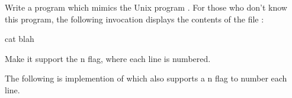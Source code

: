 \begin{Exercise}[title={Cat},difficulty=1]
\label{ex:cat}
\Question \label{ex:cat q1} Write a program which mimics the Unix program
. For those who don't know this program, the following 
invocation displays the contents of the file :
\begin{display}
\pr cat blah
\end{display}

\Question Make it support the \-n flag, where each line is
numbered.

\end{Exercise}

\begin{Answer}
\Question The following is implemention of  which also 
supports a \-n flag to number each line.

\showremarks
\end{Answer}
